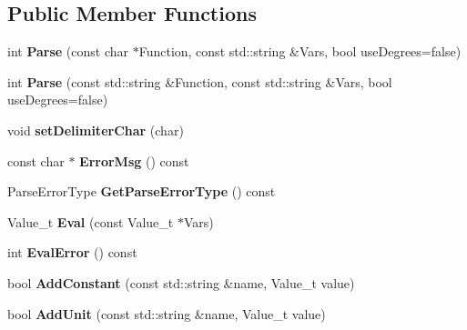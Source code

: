 \subsection*{Public Member Functions}
\begin{DoxyCompactItemize}
\item 
\mbox{\label{class_function_parser_base_a11af9197aafaca95459675399a606912}} 
int {\bfseries Parse} (const char $\ast$Function, const std\+::string \&Vars, bool use\+Degrees=false)
\item 
\mbox{\label{class_function_parser_base_aeee0eb66f38ebc4a7a66fbffac173130}} 
int {\bfseries Parse} (const std\+::string \&Function, const std\+::string \&Vars, bool use\+Degrees=false)
\item 
\mbox{\label{class_function_parser_base_ab00b7a9b93a1ff688255a4aaffbb1f19}} 
void {\bfseries set\+Delimiter\+Char} (char)
\item 
\mbox{\label{class_function_parser_base_a1d81e799766922a212c03021f7366b07}} 
const char $\ast$ {\bfseries Error\+Msg} () const
\item 
\mbox{\label{class_function_parser_base_a6abd7c5d3a1b1ca515d0a35856ee7335}} 
Parse\+Error\+Type {\bfseries Get\+Parse\+Error\+Type} () const
\item 
\mbox{\label{class_function_parser_base_a2c0d3960126fd7f68541c702dc5e24c5}} 
Value\+\_\+t {\bfseries Eval} (const Value\+\_\+t $\ast$Vars)
\item 
\mbox{\label{class_function_parser_base_a8d8d51025306b4db5f734db31a1c0b1c}} 
int {\bfseries Eval\+Error} () const
\item 
\mbox{\label{class_function_parser_base_aaab17ce1b0bf03d761c341b255cb5253}} 
bool {\bfseries Add\+Constant} (const std\+::string \&name, Value\+\_\+t value)
\item 
\mbox{\label{class_function_parser_base_a6d7748f020515ab70b0eb8885595485f}} 
bool {\bfseries Add\+Unit} (const std\+::string \&name, Value\+\_\+t value)

\end{DoxyCompactItemize}
